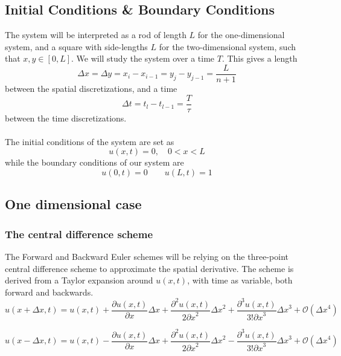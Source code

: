 \documentclass[10pt,a4paper]{article}
\newcommand{\bigO}{{\mathcal{O}}}
\newcommand{\dt}{{\Delta t}}
\newcommand{\dx}{{\Delta x}}
\newcommand{\dy}{{\Delta y}}
\newcommand{\px}{{\partial x}}
\newcommand{\pu}{{\partial u}}
\newcommand{\ppu}{{\partial^2 u}}
\newcommand{\pppu}{{\partial^3 u}}
\begin{document}
\subsection{Initial Conditions \& Boundary Conditions}
The system will be interpreted as a rod of length $L$ for the one-dimensional system, and a square with side-lengths $L$ for the two-dimensional system, such that $x,y \in [0,L]$. We will study the system over a time $T$. This gives a length
\begin{equation}
\dx = \dy = x_i - x_{i-1} = y_j - y_{j-1} = \frac{L}{n+1}
\end{equation}
between the spatial discretizations, and a time
\begin{equation}
\dt = t_l - t_{l-1} = \frac{T}{\tau}
\end{equation}
between the time discretizations.\\\\
The initial conditions of the system are set as
\begin{equation}
u(x,t) = 0, \quad 0 < x < L
\end{equation}
while the boundary conditions of our system are
\begin{equation}
u(0,t) = 0 \quad \quad u(L,t) = 1
\end{equation}


\subsection{One dimensional case}\label{sec:method:1d}
\subsubsection{The central difference scheme}\label{sec:cent}
The Forward and Backward Euler schemes will be relying on the three-point central difference scheme to approximate the spatial derivative. The scheme is derived from a Taylor expansion around $u(x,t)$, with time as variable, both forward and backwards.
\begin{equation}
u(x+\Delta x, t) = u(x,t) + \frac{\pu(x,t)}{\px}\dx + \frac{\ppu(x,t)}{2\px^2}\dx^2 + \frac{\pppu(x,t)}{3!\px^3}\dx^3 + \bigO(\dx^4)
\end{equation}

\begin{equation}
u(x-\Delta x, t) = u(x,t) - \frac{\pu(x,t)}{\px}\dx + \frac{\ppu(x,t)}{2\px^2}\dx^2 - \frac{\pppu(x,t)}{3!\px^3}\dx^3 + \bigO(\dx^4)
\end{equation}
\end{document}
